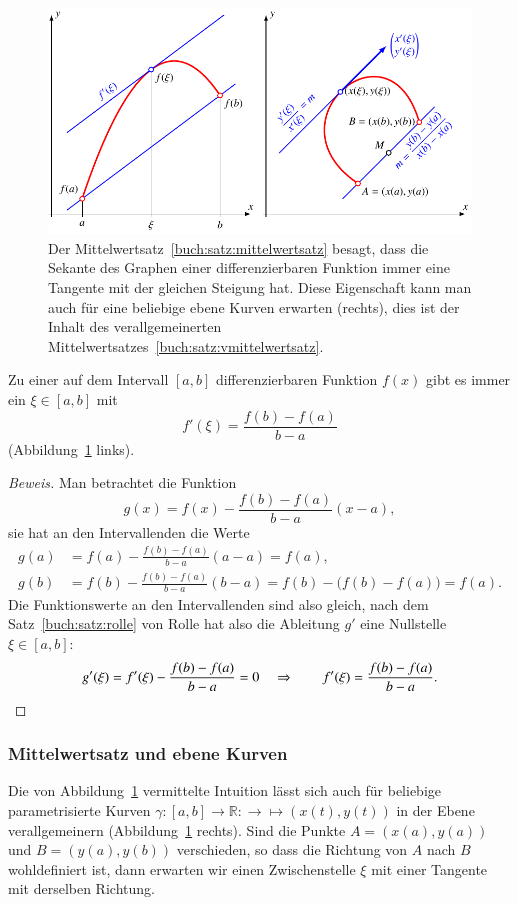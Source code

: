 \begin{figure}
\centering
\includegraphics{chapters/30-interpolation/figures/mittelwertsatz.pdf}
\caption{Der Mittelwertsatz~\ref{buch:satz:mittelwertsatz} besagt, dass
die Sekante des Graphen einer differenzierbaren Funktion immer eine
Tangente mit der gleichen Steigung hat.
Diese Eigenschaft kann man auch für eine beliebige ebene Kurven
erwarten (rechts), dies ist der Inhalt des verallgemeinerten
Mittelwertsatzes~\ref{buch:satz:vmittelwertsatz}.
\label{buch:polynome:figure:mittelwertsatz}}
\end{figure}

\begin{satz}[Mittelwertsatz]
\label{buch:satz:mittelwertsatz}
Zu einer auf dem Intervall $[a,b]$ differenzierbaren Funktion $f(x)$ gibt
es immer ein $\xi\in[a,b]$ mit
\[
f'(\xi) = \frac{f(b)-f(a)}{b-a}
\]
(Abbildung~\ref{buch:polynome:figure:mittelwertsatz} links).
\end{satz}

\begin{proof}[Beweis]
Man betrachtet die Funktion 
\[
g(x) = f(x) - \frac{f(b)-f(a)}{b-a}(x-a),
\]
sie hat an den Intervallenden die Werte
\begin{align*}
g(a) &= f(a) - \frac{f(b)-f(a)}{b-a}(a-a)=f(a),
\\
g(b) &= f(b) - \frac{f(b)-f(a)}{b-a}(b-a) = f(b) - \bigl(f(b)-f(a)\bigr) = f(a).
\end{align*}
Die Funktionswerte an den Intervallenden sind also gleich,
nach dem Satz~\ref{buch:satz:rolle} von Rolle hat also
die Ableitung $g'$ eine Nullstelle $\xi\in[a,b]$:
\[
g'(\xi) = f'(\xi) - \frac{f(b)-f(a)}{b-a} = 0
\quad
\Rightarrow
\qquad
f'(\xi) = \frac{f(b)-f(a)}{b-a}.
\qedhere
\]
\end{proof}

\subsubsection{Mittelwertsatz und ebene Kurven}
%
%
Die von Abbildung~\ref{buch:polynome:figure:mittelwertsatz} vermittelte
Intuition lässt sich auch für beliebige parametrisierte Kurven
$\gamma\colon[a,b]\to\mathbb R:\to\mapsto (x(t),y(t))$ in der Ebene
verallgemeinern (Abbildung~\ref{buch:polynome:figure:mittelwertsatz} rechts).
Sind die Punkte $A=(x(a),y(a))$ und $B=(y(a),y(b))$ verschieden,
so dass die Richtung von $A$ nach $B$ wohldefiniert ist, dann erwarten
wir einen Zwischenstelle $\xi$ mit einer Tangente mit derselben Richtung.
%

